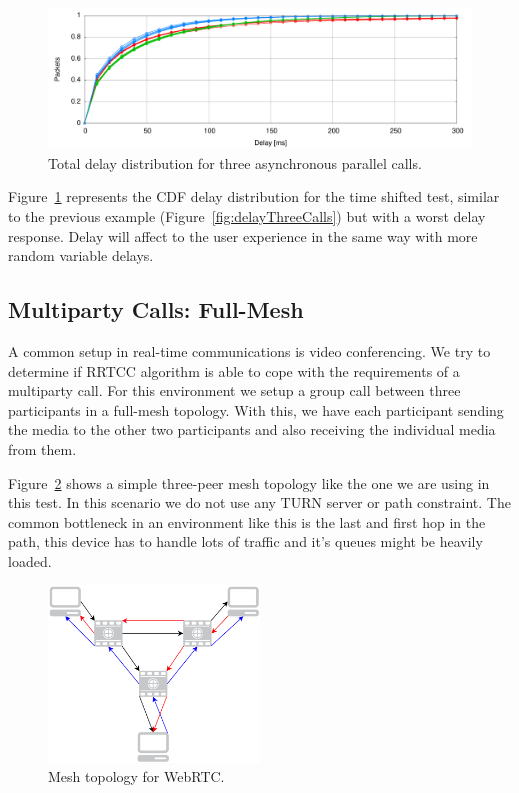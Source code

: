 \begin{figure}[h]
  \centering
    \includegraphics[width=1\textwidth]{./figures/async_total_delay_distribution.pdf}
      \caption[Total delay distribution for three asynchronous parallel calls]{Total delay distribution for three asynchronous parallel calls.}
	\label{fig:delayThreeCallsAsync}
\end{figure}

Figure~\ref{fig:delayThreeCallsAsync} represents the CDF delay distribution for the time shifted test, similar to the previous example (Figure~\ref{fig:delayThreeCalls}) but with a worst delay response. Delay will affect to the user experience in the same way with more random variable delays.

\subsection{Multiparty Calls: Full-Mesh}

A common setup in real-time communications is video conferencing. We try to determine if RRTCC algorithm is able to cope with the requirements of a multiparty call. For this environment we setup a group call between three participants in a full-mesh topology. With this, we have each participant sending the media to the other two participants and also receiving the individual media from them.

Figure~\ref{fig:meshTopology} shows a simple three-peer mesh topology like the one we are using in this test. In this scenario we do not use any TURN server or path constraint. The common bottleneck in an environment like this is the last and first hop in the path, this device has to handle lots of traffic and it's queues might be heavily loaded.

\begin{figure}[h]
  \centering
    \includegraphics[width=0.5\textwidth]{./figures/mesh.pdf}
      \caption[Mesh topology for WebRTC]{Mesh topology for WebRTC.}
	\label{fig:meshTopology}
\end{figure}

